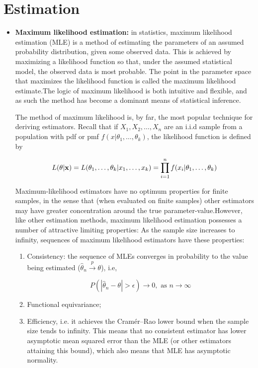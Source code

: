 \section{Estimation}
\begin{itemize}
    \item \textbf{Maximum likelihood estimation:} in statistics, maximum likelihood estimation (MLE) is a method of estimating the parameters of an assumed probability distribution, given some observed data. This is achieved by maximizing a likelihood function so that, under the assumed statistical model, the observed data is most probable. The point in the parameter space that maximizes the likelihood function is called the maximum likelihood estimate.The logic of maximum likelihood is both intuitive and flexible, and as such the method has become a dominant means of statistical inference.
    
    The method of maximum likelihood is, by far, the most popular technique for deriving estimators. Recall that if $X_1, X_2, \dots, X_n$ are an i.i.d sample from a population with pdf or pmf $f(x|\theta_1, \dots, \theta_k)$, the likelihood function is defined by
    
    \begin{equation}
        L(\theta|\bold{x}) = L(\theta_1, \dots, \theta_k|x_1, \dots, x_k) = \prod^{n}_{i=1}f(x_i|\theta_1, \dots, \theta_k)
    \end{equation}
    
    Maximum-likelihood estimators have no optimum properties for finite samples, in the sense that (when evaluated on finite samples) other estimators may have greater concentration around the true parameter-value.However, like other estimation methods, maximum likelihood estimation possesses a number of attractive limiting properties: As the sample size increases to infinity, sequences of maximum likelihood estimators have these properties: 
    
    \begin{enumerate}
        \item Consistency: the sequence of MLEs converges in probability to the value being estimated ($\hat{\theta}_n \xrightarrow {p} \theta$), i.e, 
        
        \begin{equation}
            P(|\hat{\theta}_n - \theta| > \epsilon) \to 0, \text{ as } n \to \infty
        \end{equation}
        
        \item Functional equivariance;
        \item Efficiency, i.e. it achieves the Cramér–Rao lower bound when the sample size tends to infinity. This means that no consistent estimator has lower asymptotic mean squared error than the MLE (or other estimators attaining this bound), which also means that MLE has asymptotic normality.
        

\end{enumerate}
\end{itemize}

